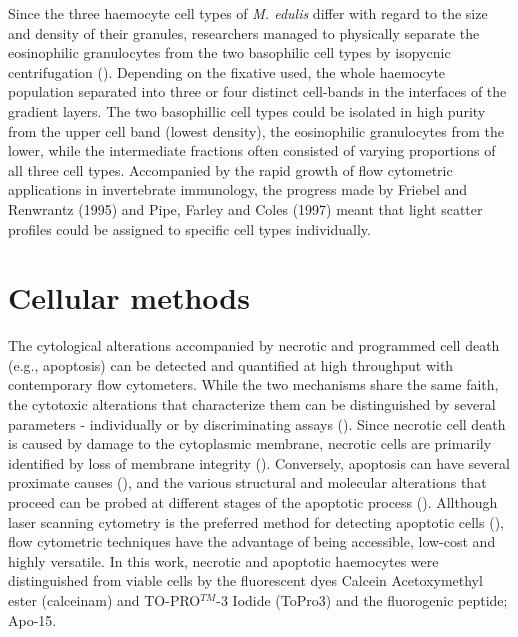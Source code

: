 Since the three haemocyte cell types of \emph{M. edulis} differ with regard to the size and density of their granules, researchers managed to physically separate the eosinophilic granulocytes from the two basophilic cell types by isopycnic centrifugation (\cite{Friebel1995, Pipe1997}). Depending on the fixative used, the whole haemocyte population separated into three or four distinct cell-bands in the interfaces of the gradient layers. The two basophillic cell types could be isolated in high purity from the upper cell band (lowest density), the eosinophilic granulocytes from the lower, while the intermediate fractions often consisted of varying proportions of all three cell types. Accompanied by the rapid growth of flow cytometric applications in invertebrate immunology, the progress made by Friebel and Renwrantz (1995) and Pipe, Farley and Coles (1997) meant that light scatter profiles could be assigned to specific cell types individually.


\section{Cellular methods}
The cytological alterations accompanied by necrotic and programmed cell death (e.g., apoptosis) can be detected and quantified at high throughput with contemporary flow cytometers. While the two mechanisms share the same faith, the cytotoxic alterations that characterize them can be distinguished by several parameters - individually or by discriminating assays (\cite{Shapiro2003}). Since necrotic cell death is caused by damage to the cytoplasmic membrane, necrotic cells are primarily identified by loss of membrane integrity (\cite{Shapiro2003}). Conversely, apoptosis can have several proximate causes (\cite{Bedoui2020}), and the various structural and molecular alterations that proceed can be probed at different stages of the apoptotic process (\cite{Kari2022}). Allthough laser scanning cytometry is the preferred method for detecting apoptotic cells (\cite{Darzynkiewicz2001}), flow cytometric techniques have the advantage of being accessible, low-cost and highly versatile. In this work, necrotic and apoptotic haemocytes were distinguished from viable cells by the fluorescent dyes Calcein Acetoxymethyl ester (\acrshort{calceinam}) and TO-PRO$^{TM}$-3 Iodide (ToPro3) and the fluorogenic peptide; Apo-15.

